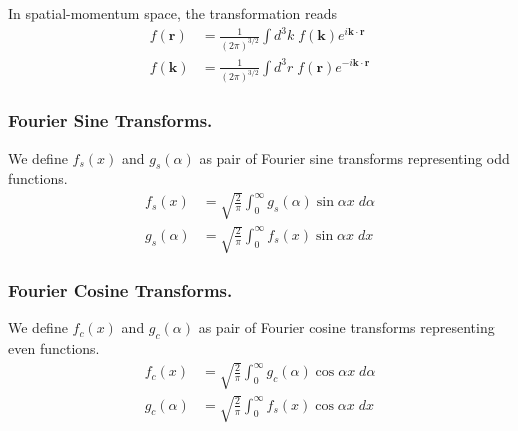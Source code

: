 \documentclass[../../../main.tex]{subfiles}
\begin{document}
In spatial-momentum space, the transformation reads
\begin{align*}
    f(\mathbf{r }) & = \frac{1 }{(2\pi)^{3/2}} \int d^3k \; f(\mathbf{k}) e^{i \mathbf{k}\cdot \mathbf{r}}  \\
    f(\mathbf{k }) & = \frac{1 }{(2\pi)^{3/2}} \int d^3r \; f(\mathbf{r}) e^{-i \mathbf{k}\cdot \mathbf{r}}
\end{align*}

\subsubsection{Fourier Sine Transforms.} We define $f_s(x)$ and $g_s(\alpha)$ as pair of Fourier sine transforms representing odd functions.
\begin{align*}
    f_s(x)      & =\sqrt{\frac{2}{\pi}}\int_{0}^{\infty }g_s(\alpha)\sin \alpha x\;d\alpha \\
    g_s(\alpha) & =\sqrt{\frac{2}{\pi}}\int_{0}^{\infty }f_s(x)\sin \alpha x\;dx
\end{align*}

\subsubsection{Fourier Cosine Transforms.} We define $f_c(x)$ and $g_c(\alpha)$ as pair of Fourier cosine transforms representing even functions.
\begin{align*}
    f_c(x)      & =\sqrt{\frac{2}{\pi}}\int_{0}^{\infty }g_c(\alpha)\cos \alpha x\;d\alpha \\
    g_c(\alpha) & =\sqrt{\frac{2}{\pi}}\int_{0}^{\infty }f_s(x)\cos \alpha x\;dx
\end{align*}
\end{document}
